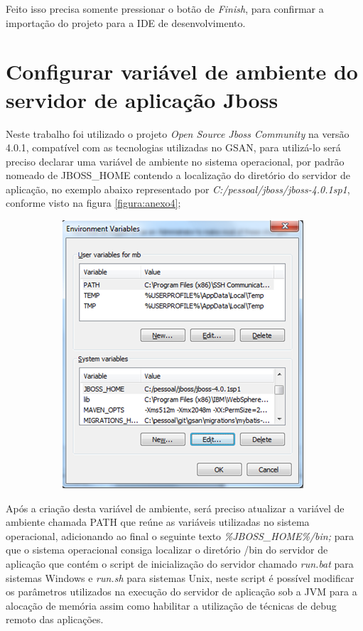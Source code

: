 \begin{apendicesenv}
Feito isso precisa somente pressionar o botão de \textit{Finish}, para confirmar a importação do projeto para a IDE de desenvolvimento.

\chapter{Configurar variável de ambiente do servidor de aplicação Jboss}

Neste trabalho foi utilizado o projeto \textit{Open Source Jboss Community} na versão 4.0.1, compatível com as tecnologias utilizadas no GSAN, para utilizá-lo será preciso declarar uma variável de ambiente no sistema operacional, por padrão nomeado de JBOSS\_HOME contendo a localização do diretório do servidor de aplicação, no exemplo abaixo representado por \textit{C:/pessoal/jboss/jboss-4.0.1sp1}, conforme visto na figura \ref{figura:anexo4};

\begin{figure}[H]
	\centering
	\caption*{Adicionando variável de ambiente JBOSS\_HOME.}
	\label{figura:anexo4}
	\begin{subfigure}[H]{\textwidth}
		\centering
		\includegraphics{figuras/anexo/var_JBOSS_HOME.png}
	\end{subfigure}
\end{figure}


Após a criação desta variável de ambiente, será preciso atualizar a variável de ambiente chamada PATH que reúne as variáveis utilizadas no sistema operacional, adicionando ao final o seguinte texto \textit{\%JBOSS\_HOME\%/bin;} para que o sistema operacional consiga localizar o diretório /bin do servidor de aplicação que contém o script de inicialização do servidor chamado \textit{run.bat} para sistemas Windows e \textit{run.sh} para sistemas Unix, neste script é possível modificar os parâmetros utilizados na execução do servidor de aplicação sob a JVM para a alocação de memória assim como habilitar a utilização de técnicas de debug remoto das aplicações.



\end{apendicesenv}
